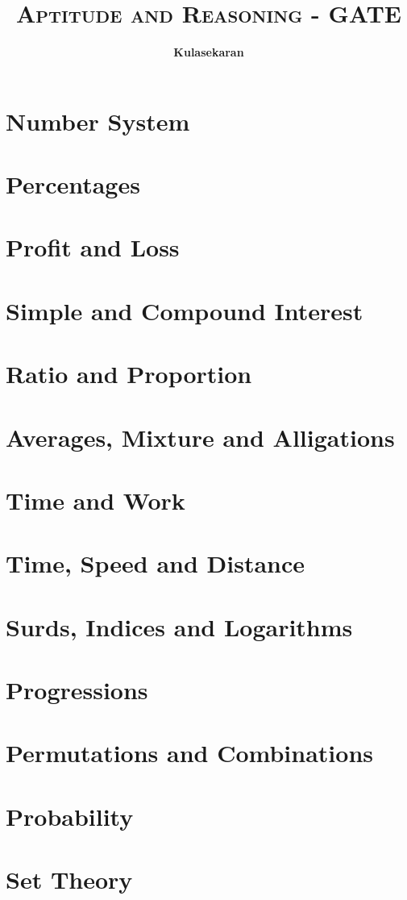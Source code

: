 \documentclass[8pt]{report}
\title{\Huge{\textsc{Aptitude and Reasoning - GATE}}}
\author{\huge{\textbf{Kulasekaran}}}
\begin{document}
\maketitle
\tableofcontents
\chapter{Number System}
\chapter{Percentages}
\chapter{Profit and Loss}
\chapter{Simple and Compound Interest}
\chapter{Ratio and Proportion}
\chapter{Averages, Mixture and Alligations}
\chapter{Time and Work}
\chapter{Time, Speed and Distance}
\chapter{Surds, Indices and Logarithms}
\chapter{Progressions}
\chapter{Permutations and Combinations}
\chapter{Probability}
\chapter{Set Theory}
\end{document}
